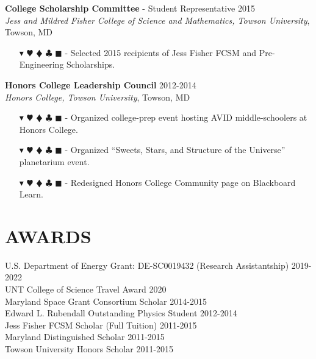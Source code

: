 \documentclass[overlapped, 10pt]{res} %
\newcommand{\physics}{$\blacktriangledown$}
\newcommand{\biochem}{$\varheartsuit$}
\newcommand{\shannon}{$\vardiamondsuit$}
\newcommand{\classic}{$\clubsuit$}
\newcommand{\quantum}{$\blacksquare$}
\newcommand{\physicscolor}{\color{YellowOrange}}
\newcommand{\biochemcolor}{\color{Emerald}}
\newcommand{\shannoncolor}{\color{Goldenrod}}
\newcommand{\classiccolor}{\color{Cyan}}
\newcommand{\quantumcolor}{\color{RedOrange}}
\newcommand{\tag}[1]{
    {\IfSubStr{#1}{\physics}{\physicscolor}{\color{White}}\physics}
    {\IfSubStr{#1}{\biochem}{\biochemcolor}{\color{White}}\biochem}
    {\IfSubStr{#1}{\shannon}{\shannoncolor}{\color{White}}\shannon}
    {\IfSubStr{#1}{\classic}{\classiccolor}{\color{White}}\classic}
    {\IfSubStr{#1}{\quantum}{\quantumcolor}{\color{White}}\quantum}
}
\begin{document}
\begin{resume}
\textbf{College Scholarship Committee} - Student Representative \hfill 2015 \\
\textit{Jess and Mildred Fisher College of Science and Mathematics, Towson University}, Towson, MD
\begin{itemize} \itemsep -2pt %
\item[\tag{}-] Selected 2015 recipients of Jess Fisher FCSM and Pre-Engineering Scholarships.
\end{itemize}

\textbf{Honors College Leadership Council} \hfill 2012-2014 \\
\textit{Honors College, Towson University}, Towson, MD
\begin{itemize} \itemsep -2pt %
\item[\tag{}-] Organized college-prep event hosting AVID middle-schoolers at Honors College.
\item[\tag{}-] Organized ``Sweets, Stars, and Structure of the Universe'' planetarium event.
\item[\tag{}-] Redesigned Honors College Community page on Blackboard Learn.
\end{itemize}




\section{AWARDS}

U.S. Department of Energy Grant: DE-SC0019432 (Research Assistantship) \hfill 2019-2022 \\
UNT College of Science Travel Award \hfill 2020 \\
Maryland Space Grant Consortium Scholar \hfill 2014-2015 \\
Edward L. Rubendall Outstanding Physics Student \hfill 2012-2014 \\
Jess Fisher FCSM Scholar (Full Tuition) \hfill 2011-2015 \\
Maryland Distinguished Scholar \hfill 2011-2015 \\
Towson University Honors Scholar \hfill 2011-2015




\end{resume}
\end{document}
